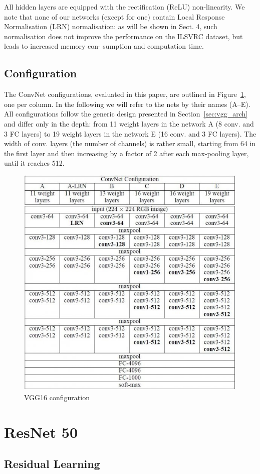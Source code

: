 \documentclass[10pt]{report}
\begin{document}
	All hidden layers are equipped with the rectification (ReLU) non-linearity.
	We note that none of our networks (except for one) contain Local Response
	Normalisation (LRN) normalisation: as will be shown in Sect. 4, such
	normalisation does not improve the performance on the ILSVRC dataset, but
	leads to increased memory con- sumption and computation time.
	\cite[1]{simonyan2015deep}

	\subsection{Configuration}

	The ConvNet configurations, evaluated in this paper, are outlined in
	Figure~\ref{fig:vgg16_conf}, one per column. In the following we will refer
	to the nets by their names (A–E).  All configurations follow the generic
	design presented in Section~\ref{sec:vgg_arch} and differ only in the
	depth: from 11 weight layers in the network A (8 conv. and 3 FC layers) to
	19 weight layers in the network E (16 conv. and 3 FC layers). The width of
	conv. layers (the number of channels) is rather small, starting from 64 in
	the first layer and then increasing by a factor of 2 after each max-pooling
	layer, until it reaches 512.
	\cite[3]{simonyan2015deep}

	\begin{figure}[ht]
		\centering
		\includegraphics[width=0.5\linewidth]{imgs/vgg16_conf}
		\caption{VGG16 configuration}%
		\label{fig:vgg16_conf}
	\end{figure}

	\section{ResNet 50}%

	\subsection{Residual Learning}
\end{document}
